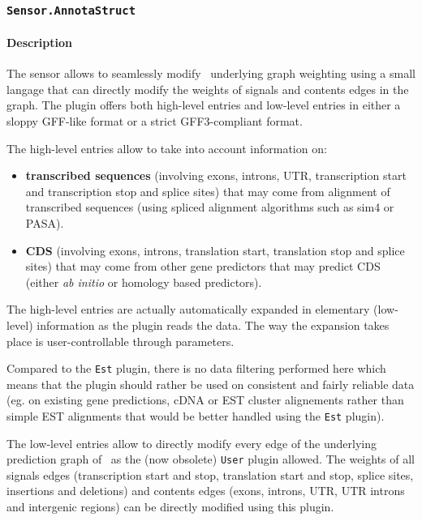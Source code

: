 
\subsubsection{\texttt{Sensor.AnnotaStruct}}

\paragraph{Description}

The sensor allows to seamlessly modify \EuGene\ underlying graph
weighting using a small langage that can directly modify the weights
of signals and contents edges in the graph. The plugin offers both
high-level entries and low-level entries in either a sloppy GFF-like
format or a strict GFF3-compliant format.

The high-level entries allow to take into account information on:
\begin{itemize}
\item \textbf{transcribed sequences} (involving exons, introns, UTR,
  transcription start and transcription stop and splice sites) that
  may come from alignment of transcribed sequences (using spliced
  alignment algorithms such as sim4 or PASA).
\item \textbf{CDS} (involving exons, introns, translation start,
  translation stop and splice sites) that may come from other gene
  predictors that may predict CDS (either \emph{ab initio} or homology based
  predictors).
\end{itemize}
The high-level entries are actually automatically expanded in
elementary (low-level) information as the plugin reads the data. The
way the expansion takes place is user-controllable through parameters.

Compared to the \texttt{Est} plugin, there is no data filtering
performed here which means that the plugin should rather be used on
consistent and fairly reliable data (eg. on existing gene predictions,
cDNA or EST cluster alignements rather than simple EST alignments that
would be better handled using the \texttt{Est} plugin).

The low-level entries allow to directly modify every edge of the
underlying prediction graph of \EuGene\ as the (now obsolete)
\texttt{User} plugin allowed. The weights of all signals edges
(transcription start and stop, translation start and stop, splice
sites, insertions and deletions) and contents edges (exons, introns,
UTR, UTR introns and intergenic regions) can be directly modified
using this plugin.

